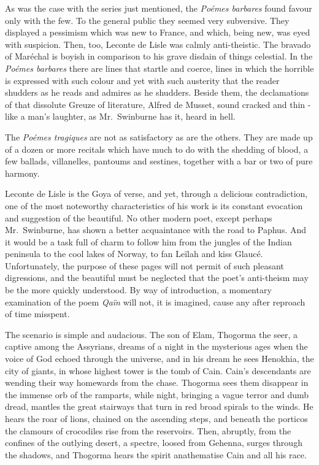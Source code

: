 \documentclass[]{book}
\begin{document}
As was the case with the series just mentioned, the \emph{Poémes
barbares} found favour only with the few. To the general public they
seemed very subversive. They displayed a pessimism which was new to
France, and which, being new, was eyed with suspicion. Then, too,
Leconte de Lisle was calmly anti-theistic. The bravado of Maréchal is
boyish in comparison to his grave disdain of things celestial. In the
\emph{Poémes barbares} there are lines that startle and coerce, lines in
which the horrible is expressed with such colour and yet with such
austerity that the reader shudders as he reads and admires as he
shudders. Beside them, the declamations of that dissolute Greuze of
literature, Alfred de Musset, sound cracked and thin - like a man's
laughter, as Mr.~Swinburne has it, heard in hell.

The \emph{Poémes tragiques} are not as satisfactory as are the others.
They are made up of a dozen or more recitals which have much to do with
the shedding of blood, a few ballads, villanelles, pantoums and
sestines, together with a bar or two of pure harmony.

Leconte de Lisle is the Goya of verse, and yet, through a delicious
contradiction, one of the most noteworthy characteristics of his work is
its constant evocation and suggestion of the beautiful. No other modern
poet, except perhaps Mr.~Swinburne, has shown a better acquaintance with
the road to Paphus. And it would be a task full of charm to follow him
from the jungles of the Indian peninsula to the cool lakes of Norway, to
fan Leïlah and kiss Glaucé. Unfortunately, the purpose of these pages
will not permit of such pleasant digressions, and the beautiful must be
neglected that the poet's anti-theism may be the more quickly
understood. By way of introduction, a momentary examination of the poem
\emph{Qaïn} will not, it is imagined, cause any after reproach of time
misspent.

The scenario is simple and audacious. The son of Elam, Thogorma the
seer, a captive among the Assyrians, dreams of a night in the mysterious
ages when the voice of God echoed through the universe, and in his dream
he sees Henokhia, the city of giants, in whose highest tower is the tomb
of Cain. Cain's descendants are wending their way homewards from the
chase. Thogorma sees them disappear in the immense orb of the ramparts,
while night, bringing a vague terror and dumb dread, mantles the great
stairways that turn in red broad spirals to the winds. He hears the roar
of lions, chained on the ascending steps, and beneath the porticos the
clamours of crocodiles rise from the reservoirs. Then, abruptly, from
the confines of the outlying desert, a spectre, loosed from Gehenna,
surges through the shadows, and Thogorma hears the spirit anathematise
Cain and all his race.
\end{document}
